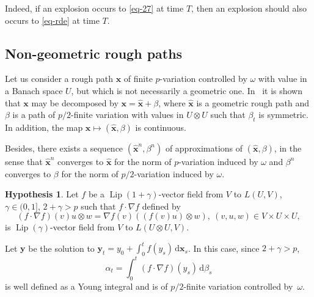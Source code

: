 \documentclass[a4paper,12pt]{article}
\theoremstyle{definition}
\newtheorem{hypothesis}{Hypothesis}
\newcommand{\vd}{\,\mathrm{d}}
\newcommand{\bx}{\mathbf{x}}
\newcommand{\by}{\mathbf{y}}
\DeclareMathOperator{\Lip}{Lip}
\begin{document}
Indeed, if an explosion occurs to \eqref{eq-27} at
time $T$, then an explosion should also occurs to \eqref{eq-rde}
at time $T$.



\subsection{Non-geometric rough paths}


Let us consider  a rough path $\bx$ of finite $p$-variation controlled
by $\omega$ with value in a
 Banach space $U$, but which is not necessarily a geometric one.  In~\cite{lejay-victoir06a} it is shown that $\bx$
may be decomposed by $\bx=\widehat{\bx}+\beta$, 
where $\widehat{\bx}$ is a geometric rough path and 
$\beta$ is a path of $p/2$-finite variation with 
values in $U\otimes U$ such that $\beta_t$ is symmetric.
In addition, the map $\bx\mapsto (\widehat{\bx},\beta)$ is continuous.

Besides, there exists a sequence $(\widehat{\bx}^n,\beta^n)$ of approximations
of $(\widehat{\bx},\beta)$, in the sense that $\widehat{\bx}^n$
converges to $\widehat{\bx}$ for the norm of $p$-variation induced by $\omega$
and $\beta^n$ converges to $\beta$ for the norm of $p/2$-variation
induced by $\omega$.


\begin{hypothesis}
\label{hyp-3}
Let $f$ be a $\Lip(1+\gamma)$-vector field from $V$ to $L(U,V)$, $\gamma\in(0,1]$, $2+\gamma>p$ 
such 
that $f\cdot\nabla f$ defined by 
\begin{equation*}
(f\cdot\nabla f)(v)u\otimes w=\nabla f(v)((f(v) u)\otimes w),
\ (v,u,w)\in V\times U\times U,
\end{equation*}
is $\Lip(\gamma)$-vector field from $V$ to $L(U\otimes U,V)$.
\end{hypothesis}

Let $\by$ be the solution to $\by_t=y_0+\int_0^t f(y_s)\vd\bx_s$.
In this case, since $2+\gamma>p$, 
\begin{equation*}
\alpha_t=\int_0^t (f\cdot\nabla f)(y_s)\vd \beta_s
\end{equation*}
is well defined as a Young integral and is of $p/2$-finite variation
controlled by~$\omega$.
\end{document}
